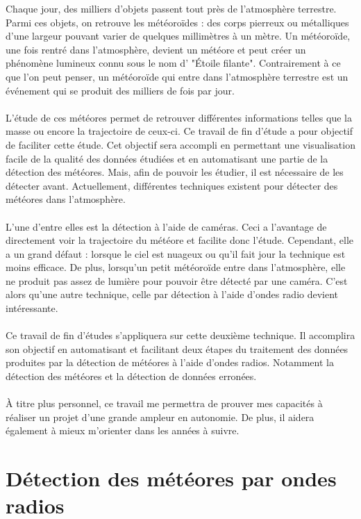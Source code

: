 \documentclass[11pt]{article}
\begin{document}
Chaque jour, des milliers d'objets passent tout près de l'atmosphère terrestre.
Parmi ces objets, on retrouve les météoroïdes : des corps pierreux ou métalliques d'une largeur pouvant varier de quelques millimètres à un mètre.
Un météoroïde, une fois rentré dans l'atmosphère, devient un météore et peut créer un phénomène lumineux connu sous le nom d' "Étoile filante".
Contrairement à ce que l'on peut penser, un météoroïde qui entre dans l'atmosphère terrestre est un événement qui se produit des milliers de fois par jour.
\\
\\
L'étude de ces météores permet de retrouver différentes informations telles que la masse ou encore la trajectoire de ceux-ci.
Ce travail de fin d'étude a pour objectif de faciliter cette étude.
Cet objectif sera accompli en permettant une visualisation facile de la qualité des données étudiées et en automatisant une partie de la détection des météores.
Mais, afin de pouvoir les étudier, il est nécessaire de les détecter avant.
Actuellement, différentes techniques existent pour détecter des météores dans l'atmosphère.
\\
\\
L'une d'entre elles est la détection à l'aide de caméras.
Ceci a l'avantage de directement voir la trajectoire du météore et facilite donc l'étude.
Cependant, elle a un grand défaut : lorsque le ciel est nuageux ou qu'il fait jour la technique est moins efficace.
De plus, lorsqu'un petit météoroïde entre dans l'atmosphère, elle ne produit pas assez de lumière pour pouvoir être détecté par une caméra.
C'est alors qu'une autre technique, celle par détection à l'aide d'ondes radio devient intéressante.
\\
\\
Ce travail de fin d'études s'appliquera sur cette deuxième technique.
Il accomplira son objectif en automatisant et facilitant deux étapes du traitement des données produites par la détection de météores à l'aide d'ondes radios.
Notamment la détection des météores et la détection de données erronées.\\
\\
À titre plus personnel, ce travail me permettra de prouver mes capacités à réaliser un projet d'une grande ampleur en autonomie.
De plus, il aidera également à mieux m'orienter dans les années à suivre.

\newpage

\section{Détection des météores par ondes radios}
\end{document}
